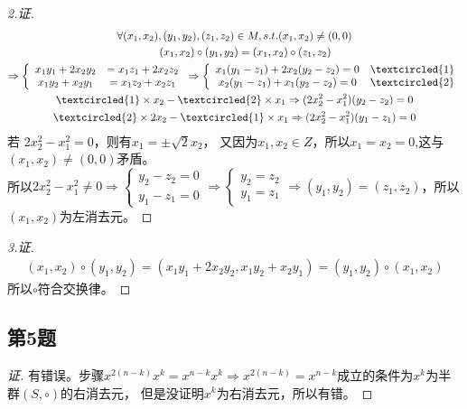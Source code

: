 \documentclass[11pt]{article}
\begin{document}
\begin{proof}[2.证]
  \begin{gather*}
    \forall (x_1, x_2), (y_1, y_2), (z_1, z_2) \in M, s.t. (x_1, x_2) \neq (0, 0)\\
    \qquad (x_1, x_2) \circ (y_1, y_2) = (x_1, x_2) \circ (z_1, z_2) \\
    \Rightarrow \left\{
      \begin{array}{cc}
        x_1y_1 + 2x_2y_2 &= x_1z_1 + 2x_2z_2 \\
        x_1y_2 + x_2y_1 &= x_1z_2 + x_2z_1
      \end{array}
    \right.
    \Rightarrow \left\{
      \begin{array}{cr}
        x_1(y_1 - z_1) + 2x_2(y_2 - z_2) = 0 &\textcircled{1} \\
        x_2(y_1 - z_1) + x_1(y_2 - z_2) = 0 &\textcircled{2}
      \end{array}
    \right.\\
    \textcircled{1} \times x_2 - \textcircled{2} \times x_1 \Rightarrow (2x_2^2 - x_1^2) (y_2 - z_2) = 0 \\
    \textcircled{2} \times 2x_2 - \textcircled{1} \times x_1  \Rightarrow (2x_2^2 - x_1^2) (y_1 - z_1) = 0 \\
  \end{gather*}
  若 $2x_2^2 - x_1^2 = 0$，则有$x_1 = \pm \sqrt{2} x_2$，
  又因为$x_1, x_2 \in Z$，所以$x_1 = x_2 = 0$,这与$(x_1,x_2) \neq (0, 0)$矛盾。\\
  所以$2x_2^2 - x_1^2 \neq 0 \Rightarrow
  \left\{\begin{array}{c} y_2 - z_2 = 0 \\ y_1 - z_1 = 0 \end{array} \right.
  \Rightarrow \left\{\begin{array}{c} y_2 = z_2 \\ y_1 = z_1  \end{array} \right.
  \Rightarrow (y_1, y_2) = (z_1, z_2)$，所以$(x_1, x_2)$为左消去元。
\end{proof}

\begin{proof}[3.证]
  \begin{align*}
    (x_1, x_2) \circ (y_1, y_2) = (x_1y_1 + 2x_2y_2, x_1y_2 + x_2y_1) = (y_1, y_2) \circ (x_1, x_2)
  \end{align*}
  所以$\circ$符合交换律。
\end{proof}

\subsection{第5题}
\begin{proof}[证]
  有错误。步骤$x^{2(n-k)}x^k = x^{n-k}x^k \Rightarrow x^{2(n-k)} = x^{n-k}$成立的条件为$x^k$为半群$(S, \circ)$的右消去元，
  但是没证明$x^k$为右消去元，所以有错。
\end{proof}
\end{document}
